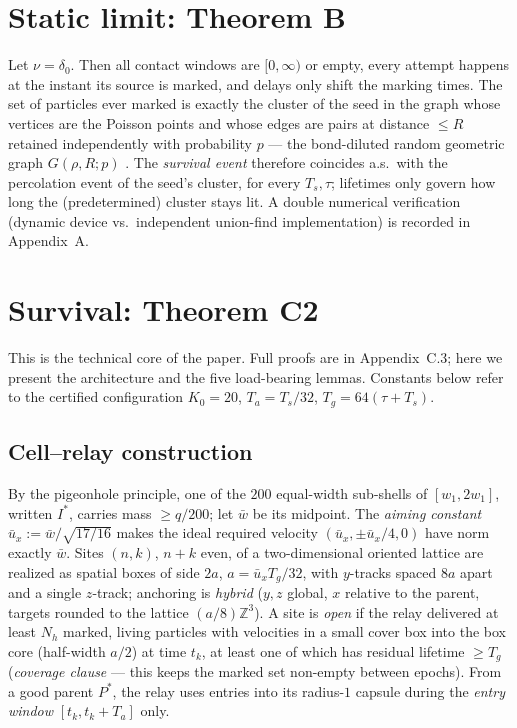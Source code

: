 \documentclass[11pt]{article}
\newcommand{\Ts}{T_s}
\newcommand{\Ta}{T_a}
\newcommand{\Tg}{T_g}
\newcommand{\wbar}{\bar w}
\begin{document}
\section{Static limit: Theorem B}\label{sec:thmB}

Let $\nu=\delta_0$. Then all contact windows are $[0,\infty)$ or empty,
every attempt happens at the instant its source is marked, and delays only
shift the marking times. The set of particles ever marked is exactly the
cluster of the seed in the graph whose vertices are the Poisson points and
whose edges are pairs at distance $\le R$ retained independently with
probability $p$ --- the bond-diluted random geometric graph $G(\rho,R;p)$
\cite{penrose,meesterroy,franceschetti}. The \emph{survival event} therefore
coincides a.s.\ with the percolation event of the seed's cluster, for every
$\Ts,\tau$; lifetimes only govern how long the (predetermined) cluster stays
lit. A double numerical verification (dynamic device vs.\ independent
union-find implementation) is recorded in Appendix~A.

\section{Survival: Theorem C2}\label{sec:thmC2}

This is the technical core of the paper. Full proofs are in Appendix~C.3;
here we present the architecture and the five load-bearing lemmas. Constants
below refer to the certified configuration $K_0=20$, $\Ta=\Ts/32$,
$\Tg=64(\tau+\Ts)$.

\subsection{Cell--relay construction}
By the pigeonhole principle, one of the $200$ equal-width sub-shells of
$[w_1,2w_1]$, written $I^*$, carries mass $\ge q/200$; let $\wbar$ be its
midpoint. The \emph{aiming constant} $\bar u_x:=\wbar/\sqrt{17/16}$ makes
the ideal required velocity $(\bar u_x,\pm\bar u_x/4,0)$ have norm exactly
$\wbar$. Sites $(n,k)$, $n+k$ even, of a two-dimensional oriented lattice are
realized as spatial boxes of side $2a$, $a=\bar u_x\Tg/32$, with $y$-tracks
spaced $8a$ apart and a single $z$-track; anchoring is \emph{hybrid} ($y,z$
global, $x$ relative to the parent, targets rounded to the lattice
$(a/8)\mathbb{Z}^3$). A site is \emph{open} if the relay delivered at least
$N_h$ marked, living particles with velocities in a small cover box into the
box core (half-width $a/2$) at time $t_k$, at least one of which has residual
lifetime $\ge\Tg$ (\emph{coverage clause} --- this keeps the marked set
non-empty between epochs). From a good parent $P^*$, the relay uses entries
into its radius-$1$ capsule during the \emph{entry window}
$[t_k,t_k+\Ta]$ only.
\end{document}
